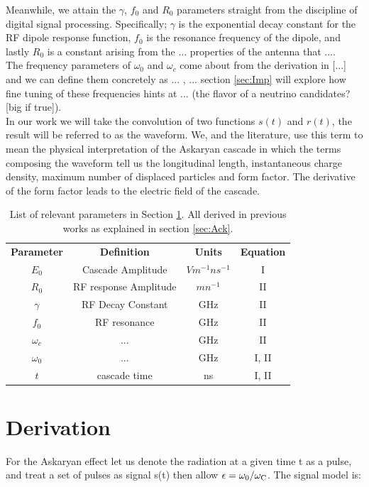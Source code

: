 \documentclass[amsmath,amssymb,aps,prd,10pt,twocolumn,showkeys]{revtex4}
\begin{document}
Meanwhile, we attain the $\gamma$, $f_0$ and $R_0$ parameters straight from the discipline of digital signal processing. Specifically; $\gamma$ is the exponential decay constant for the RF dipole response function, $f_0$ is the resonance frequency of the dipole, and lastly $R_0$ is a constant arising from the ... properties of the antenna that .... \\

The frequency parameters of $\omega_0$ and $\omega_c$ come about from the derivation in [...] and we can define them concretely as ... , ... section \ref{sec:Imp} will explore how fine tuning of these frequencies hints at ... (the flavor of a neutrino candidates? [big if true]). \\ 

In our work we will take the convolution of two functions $s(t)$ and $r(t)$, the result will be referred to as the waveform. We, and the literature, use this term to mean the physical interpretation of the Askaryan cascade in which the terms composing the waveform tell us the longitudinal length, instantaneous charge density, maximum number of displaced particles and form factor. The derivative of the form factor leads to the electric field of the cascade.

\label{sec:Par}
\begin{table}
\centering
\begin{tabular}{| c | c | c | c |}
\hline
\textbf{Parameter} & \textbf{Definition} & \textbf{Units} & \textbf{Equation} \\
$E_0$ & Cascade Amplitude  & $Vm^{-1}ns^{-1}$ &  I \\
$R_0$ & RF response Amplitude  & $m n^{-1}$ &  II \\
$\gamma$ & RF Decay Constant  & GHz &  II \\
$f_0$ & RF resonance  & GHz &  II \\
$\omega_c$ & ...  & GHz &  II \\
$\omega_0$ & ...  & GHz &  I, II \\
$t$ & cascade time  & ns &  I, II \\



\hline
\end{tabular}
\caption{\label{tab:results2} List of relevant parameters in Section \ref{sec:Der}. All derived in previous works as explained in section \ref{sec:Ack}.}
\end{table}



\section{Derivation}
\label{sec:Der}
For the Askaryan effect let us denote the radiation at a given time t as a pulse, and treat a set of pulses as signal s(t) then allow $\epsilon = \omega_0/\omega_{\rm C}$.  The signal model is:
\end{document}
